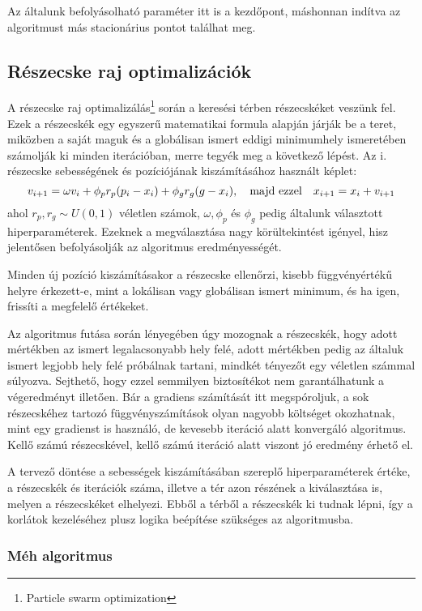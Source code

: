 Az általunk befolyásolható paraméter itt is a kezdőpont, máshonnan indítva az algoritmust más stacionárius pontot találhat meg.
\subsection{Részecske raj optimalizációk}
A részecske raj optimalizálás\footnote{Particle swarm optimization} során a keresési térben részecskéket veszünk fel. Ezek a részecskék egy egyszerű matematikai formula alapján járják be a teret, miközben a saját maguk és a globálisan ismert eddigi minimumhely ismeretében számolják ki minden iterációban, merre tegyék meg a következő lépést. Az i. részecske sebességének és pozíciójának kiszámításához használt képlet:
\begin{equation}
	\label{eq:pso}
	v_{i+1}=\omega v_{i}+\phi _pr_p(p_{i}-x_{i})+\phi_gr_g(g-x_{i}), \quad\textnormal{majd ezzel}\quad x_{i+1}=x_i+v_{i+1}
\end{equation}
ahol $r_p, r_g \sim U(0,1)$ véletlen számok, $\omega, \phi_p$ és $\phi_g$ pedig általunk választott hiperparaméterek. Ezeknek a megválasztása nagy körültekintést igényel, hisz jelentősen befolyásolják az algoritmus eredményességét.

Minden új pozíció kiszámításakor a részecske ellenőrzi, kisebb függvényértékű helyre érkezett-e, mint a lokálisan vagy globálisan ismert minimum, és ha igen, frissíti a megfelelő értékeket.

Az algoritmus futása során lényegében úgy mozognak a részecskék, hogy adott mértékben az ismert legalacsonyabb hely felé, adott mértékben pedig az általuk ismert legjobb hely felé próbálnak tartani, mindkét tényezőt egy véletlen számmal súlyozva. Sejthető, hogy ezzel semmilyen biztosítékot nem garantálhatunk a végeredményt illetően. Bár a gradiens számítását itt megspóroljuk, a sok részecskéhez tartozó függvényszámítások olyan nagyobb költséget okozhatnak, mint egy gradienst is használó, de kevesebb iteráció alatt konvergáló algoritmus. Kellő számú részecskével, kellő számú iteráció alatt viszont jó eredmény érhető el.

A tervező döntése a sebességek kiszámításában szereplő hiperparaméterek értéke, a részecskék és iterációk száma, illetve a tér azon részének a kiválasztása is, melyen a részecskéket elhelyezi. Ebből a térből a részecskék ki tudnak lépni, így a korlátok kezeléséhez plusz logika beépítése szükséges az algoritmusba.

\subsubsection{Méh algoritmus}

